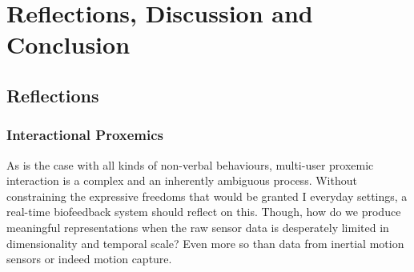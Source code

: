 








\chapter{Reflections, Discussion and Conclusion}
\label{cha:conclusion}

\section{Reflections}

\subsection{Interactional Proxemics}
As is the case with all kinds of non-verbal behaviours, multi-user proxemic interaction is a complex and an inherently ambiguous process. Without constraining the expressive freedoms that would be granted I everyday settings, a real-time biofeedback system should reflect on this. Though, how do we produce meaningful representations when the raw sensor data is desperately limited in dimensionality and temporal scale? Even more so than data from inertial motion sensors  or indeed motion capture.  

